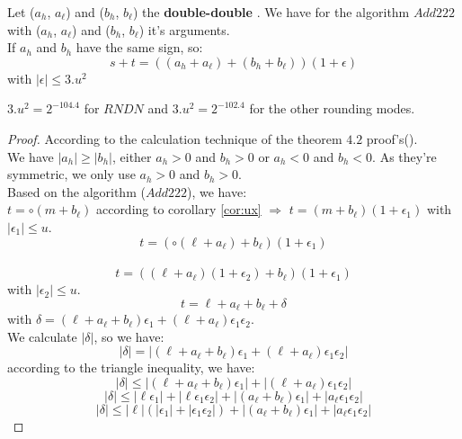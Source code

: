 \begin{theo}
Let ($a_h$, $a_{\ell}$) and ($b_h$, $b_{\ell}$) the \textbf{double-double} . We have for the algorithm $Add222$ with ($a_h$, $a_{\ell}$) and ($b_h$, $b_{\ell}$) it's arguments.\\
If $a_h$ and $b_h$ have the same sign, so:\\
$$ s+t = ((a_h+a_{\ell}) + (b_h + b_{\ell}))(1+\epsilon)$$
with $\lvert \epsilon \rvert \le 3.u^2$ 
\end{theo}
$3.u^2 = 2^{-104.4}$ for $RNDN$ and $3.u^2 = 2^{-102.4}$ for the other rounding modes.

\begin{proof} \color{-yellow}
According to the calculation technique of the theorem $4.2$ proof's(\cite{lauter2005basic}).\\
We have $\lvert a_h \rvert \ge \lvert b_h \rvert$, either $a_h > 0$ and $b_h > 0$ or $a_h < 0$ and $b_h < 0$. As they're symmetric, we only use $a_h > 0$ and $b_h > 0$.\\
Based on the algorithm ($Add222$), we have:\\
$t = \circ (m +b_{\ell})$ according to corollary \ref{cor:ux} 
$\Rightarrow$ $t = (m+b_{\ell})(1+\epsilon_1)$ with $\lvert \epsilon_1 \rvert \le u$.\\
$$t = (\circ (\ell+ a_{\ell})+b_{\ell})(1+\epsilon_1)$$ \\
$$t = ((\ell +a_{\ell})(1+\epsilon_2) + b_{\ell})(1+\epsilon_1)$$ with $\lvert \epsilon_2 \rvert \le u$.\\
$$t = \ell + a_{\ell} + b_{\ell} + \delta$$
with  $\delta = (\ell + a_{\ell}  + b_{\ell}) \epsilon_1 + (\ell + a_{\ell}) \epsilon_1 \epsilon_2$.\\ 
We calculate $\lvert \delta \rvert$, so we have:\\
$$ \lvert \delta \rvert = \lvert (\ell + a_{\ell} + b_{\ell})\epsilon_1 + (\ell + a_{\ell})\epsilon_1 \epsilon_2 \rvert$$
according to the triangle inequality, we have:
$$ \lvert \delta \rvert \le \lvert (\ell + a_{\ell} + b_{\ell})\epsilon_1 \rvert + \lvert (\ell + a_{\ell})\epsilon_1 \epsilon_2 \rvert$$
$$ \lvert \delta \rvert \le \lvert \ell  \epsilon_1\rvert + \lvert \ell  \epsilon_1 \epsilon_2 \rvert + \lvert (a_{\ell} + b_{\ell})\epsilon_1 \rvert + \lvert  a_{\ell}\epsilon_1 \epsilon_2 \rvert$$
$$ \lvert \delta \rvert \le \lvert \ell \rvert (\lvert \epsilon_1\rvert + \lvert   \epsilon_1 \epsilon_2 \rvert) + \lvert (a_{\ell} + b_{\ell})\epsilon_1 \rvert + \lvert  a_{\ell}\epsilon_1 \epsilon_2 \rvert$$ 


\end{proof}
